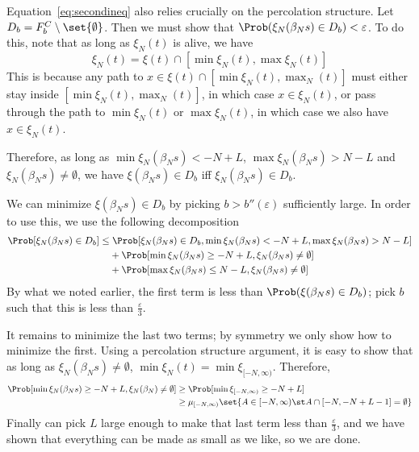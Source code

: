 \documentclass{scrartcl}
\newcommand{\ep}{\varepsilon}
\begin{document}
Equation~\ref{eq:secondineq} also relies crucially on the percolation structure. Let $D_{b} = F_{b}^{C} \setminus \set{\emptyset}$. Then we must show that $\Prob(\xi_{N}(\beta_{N}s) \in D_{b}) < \ep$. To do this, note that as long as $\xi_{N}(t)$ is alive, we have
\[ \xi_{N}(t) = \xi(t) \cap [\min \xi_{N}(t), \max \xi_{N}(t)] \]
This is because any path to $x \in \xi(t) \cap [\min \xi_{N}(t), \max_{N}(t)]$ must either stay inside $[\min \xi_{N}(t), \max_{N}(t)]$, in which case $x \in \xi_{N}(t)$, or pass through the path to $\min \xi_{N}(t)$ or $\max \xi_{N}(t)$, in which case we also have $x \in \xi_{N}(t)$.

Therefore, as long as $\min \xi_{N}(\beta_{N}s) < -N + L$, $\max \xi_{N}(\beta_{N}s) > N - L$ and $\xi_{N}(\beta_{N}s) \neq \emptyset$, we have $\xi(\beta_{N}s) \in D_{b}$ iff $\xi_{N}(\beta_{N}s) \in D_{b}$.

We can minimize $\xi(\beta_{N}s) \in D_{b}$ by picking $b > b''(\ep)$ sufficiently large. In order to use this, we use the following decomposition
\begin{align*}
  \Prob[\xi_{N}(\beta_{N}s) \in D_{b}] \leq&\; \Prob[\xi_{N}(\beta_{N}s) \in D_{b}, \min \xi_{N}(\beta_{N}s) < -N + L, \max \xi_{N}(\beta_{N}s) > N - L] \\
                                &+ \Prob[\min \xi_{N}(\beta_{N}s) \geq -N + L, \xi_{N}(\beta_{N}s) \neq \emptyset] \\
                                &+ \Prob[\max \xi_{N}(\beta_{N}s) \leq N - L, \xi_{N}(\beta_{N}s) \neq \emptyset]
\end{align*}
By what we noted earlier, the first term is less than $\Prob(\xi(\beta_{N}s) \in D_{b})$; pick $b$ such that this is less than $\frac{\ep}{3}$.

It remains to minimize the last two terms; by symmetry we only show how to minimize the first. Using a percolation structure argument, it is easy to show that as long as $\xi_{N}(\beta_{N}s) \neq \emptyset$, $\min \xi_{N}(t) = \min \xi_{[-N,\infty)}$. Therefore,
\begin{align*}
  \Prob[\min \xi_{N}(\beta_{N}s) \geq -N + L, \xi_{N}(\beta_{N}) \neq \emptyset] &\geq \Prob[\min \xi_{[-N,\infty)} \geq -N+L] \\
  &\geq \mu_{[-N,\infty)}\set{A \in [-N,\infty) \st A \cap [-N,-N+L-1] = \emptyset}
\end{align*}
Finally can pick $L$ large enough to make that last term less than $\frac{\ep}{3}$, and we have shown that everything can be made as small as we like, so we are done.
\end{document}
